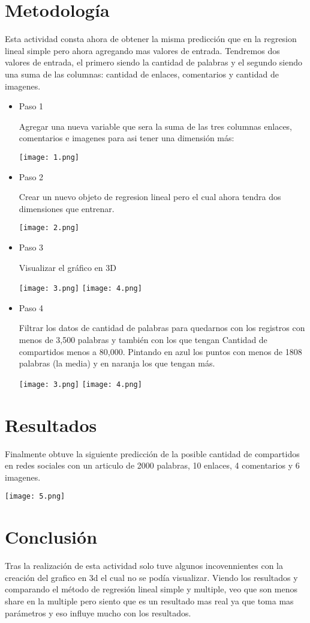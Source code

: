 \documentclass{article}
\begin{document}
\section{Metodología}
Esta actividad consta ahora de obtener la misma predicción que en la regresion lineal simple pero ahora agregando mas valores de entrada.
Tendremos dos valores de entrada, el primero siendo la cantidad de palabras y el segundo siendo una suma de las columnas: cantidad de enlaces, comentarios y cantidad de imagenes.
\begin{itemize}
\item Paso 1

Agregar una nueva variable que sera la suma de las tres columnas enlaces, comentarios e imagenes para asi tener una dimensión más:

\texttt{[image: 1.png]}
\item Paso 2

Crear un nuevo objeto de regresion lineal pero el cual ahora tendra dos dimensiones que entrenar.

\texttt{[image: 2.png]}

\item Paso 3

Visualizar el gráfico en 3D

\texttt{[image: 3.png]}
\texttt{[image: 4.png]}

\item Paso 4

Filtrar los datos de cantidad de palabras para quedarnos con los registros con menos de 3,500 palabras y también con los que tengan Cantidad de compartidos menos a 80,000. Pintando en azul los
 puntos con menos de 1808 palabras (la media) y en naranja los que tengan más.

\texttt{[image: 3.png]}
\texttt{[image: 4.png]}

\end{itemize}

\section{Resultados}

Finalmente obtuve la siguiente predicción de la posible cantidad de compartidos en redes sociales con un articulo de 2000 palabras, 10 enlaces, 4 comentarios y 6 imagenes.

\texttt{[image: 5.png]}

\section{Conclusión}
Tras la realización de esta actividad solo tuve algunos incovennientes con la creación del grafico en 3d el cual no se podía visualizar.
Viendo los resultados y comparando el método de regresión lineal simple y multiple, veo que son menos share en la multiple pero siento que es un resultado mas real ya que toma mas parámetros y eso influye mucho con los resultados.
\end{document}
